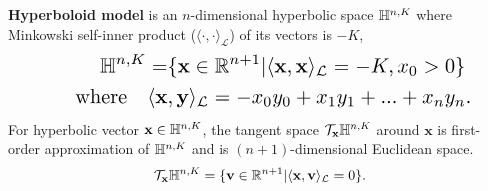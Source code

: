 \textbf{Hyperboloid model} is an $ n $-dimensional hyperbolic space $ \Bbb H^{n,K} $ where Minkowski self-inner product ($ \langle\cdot,\cdot\rangle_\mathcal{L} $) of its vectors is $ -K $,
\begin{equation}
\resizebox{0.88\columnwidth}{!}{
$ \begin{split}
    \Bbb H^{n,K}=&\{\textbf{x}\in\Bbb R^{n+1}|\langle\textbf{x},\textbf{x}\rangle_{\mathcal{L}}=-K,x_0>0\}\\
    \text{\quad where\quad}%
    \langle\textbf{x}&,\textbf{y}\rangle_{\mathcal{L}}=-x_0y_0+x_1y_1+...+x_ny_n.
\end{split} $}
\end{equation}
For hyperbolic vector $ \textbf{x}\in\Bbb H^{n,K} $, the tangent space $ \mathcal{T}_{\textbf{x}}\Bbb H^{n,K} $ around $ \textbf{x} $ is first-order approximation of $ \Bbb H^{n,K} $ and is $ (n+1) $-dimensional Euclidean space.
\begin{equation}
     \mathcal{T}_{\textbf{x}}\Bbb H^{n,K}=\{\textbf{v}\in\Bbb R^{n+1}|\langle\textbf{x},\textbf{v}\rangle_{\mathcal{L}}=0\}.
\end{equation}

